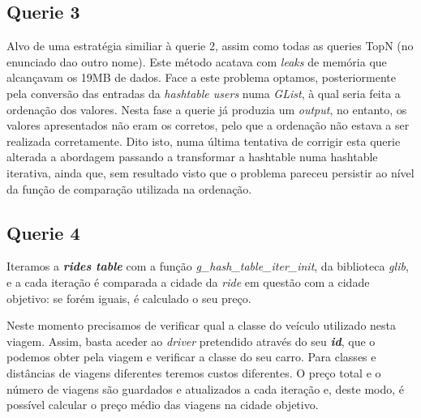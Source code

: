\documentclass[12pt,a4paper]{article}
\begin{document}
\subsection{Querie 3}
    \par Alvo de uma estratégia similiar à querie 2, assim como todas as queries TopN (no enunciado dao outro nome). Este método acatava com \textit{leaks} de memória que alcançavam os 19MB de dados. Face a este problema optamos, posteriormente pela conversão das entradas da \textit{hashtable users} numa \textit{GList}, à qual seria feita a ordenação dos valores. Nesta fase a querie já produzia um \textit{output}, no entanto, os valores apresentados não eram os corretos, pelo que a ordenação não estava a ser realizada corretamente. Dito isto, numa última tentativa de corrigir esta querie alterada a abordagem passando a transformar a hashtable numa hashtable iterativa, ainda que, sem resultado visto que o problema pareceu persistir ao nível da função de comparação utilizada na ordenação.
    \subsection{Querie 4}
    \par Iteramos a \textit{\textbf{rides table}} com a função \textit{g\_hash\_table\_iter\_init}, da biblioteca \textit{glib}, e a cada iteração é comparada a cidade da \textit{ride} em questão com a cidade objetivo: se forém iguais, é calculado o seu preço.
    \par Neste momento precisamos de verificar qual a classe do veículo utilizado nesta viagem. Assim, basta aceder ao \textit{driver} pretendido através do seu \textit{\textbf{id}}, que o podemos obter pela viagem e verificar a classe do seu carro. Para classes e distâncias de viagens diferentes teremos custos diferentes. O preço total  e o número de viagens são guardados e atualizados a cada iteração e, deste modo, é possível calcular o preço médio das viagens na cidade objetivo.
\end{document}
